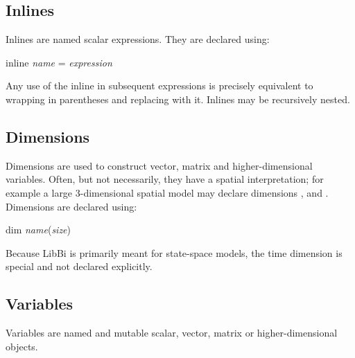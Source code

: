 \subsection{Inlines\label{Inlines}}

Inlines are named scalar expressions. They are declared using:
\begin{bicode}
inline \emph{name} = \emph{expression}
\end{bicode}
Any use of the inline  in subsequent expressions is
precisely equivalent to wrapping  in parentheses and
replacing  with it. Inlines may be recursively nested.

\subsection{Dimensions\label{Dimensions}}

 Dimensions are used to construct
vector, matrix and
higher-dimensional variables. Often, but not
necessarily, they have a spatial interpretation; for example a large
3-dimensional spatial model may declare dimensions
,  and . Dimensions are declared using:
\begin{bicode}
dim \emph{name}(\emph{size})
\end{bicode}

\begin{tip}
Because LibBi is primarily meant for state-space models, the time dimension is
special and not declared explicitly.
\end{tip}

\subsection{Variables\label{Variables}}

 Variables are named and mutable
scalar, vector, matrix or
higher-dimensional objects.

